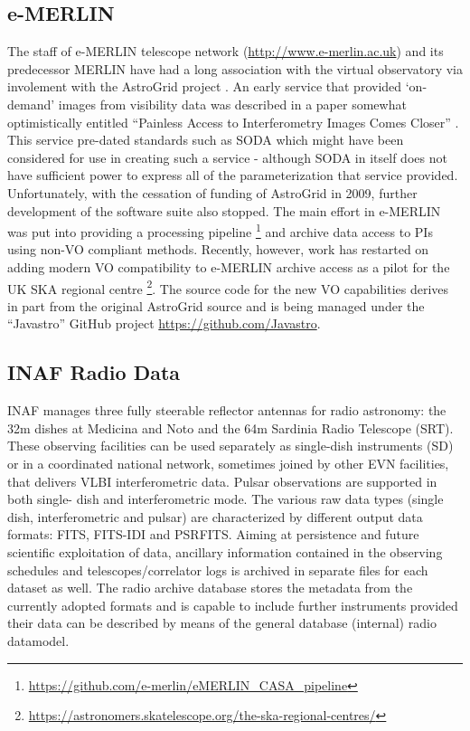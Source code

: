 \documentclass[11pt,a4paper]{ivoatex/ivoa}
\begin{document}
\subsection{e-MERLIN}
\label{sec:emerlin}
The staff of e-MERLIN telescope network (\url{http://www.e-merlin.ac.uk}) and its predecessor MERLIN have had a long association with the virtual
observatory via involement with the AstroGrid project \citep{2002ASPC..281....3M}. An early service that
 provided `on-demand' images from visibility data was described in a paper somewhat optimistically entitled
``Painless Access to Interferometry Images Comes Closer'' \citep{2006ASPC..351..267R}. This service pre-dated standards
such as SODA which might have been considered for use in creating such a service - although SODA in itself does not
have sufficient power to express all of the parameterization that service provided. Unfortunately, with the cessation
of funding of AstroGrid in 2009, further development of the software suite also stopped. The main effort in e-MERLIN was 
put into providing a processing pipeline \footnote{\url{https://github.com/e-merlin/eMERLIN_CASA_pipeline}} and archive data access to
PIs using non-VO compliant methods. Recently, however, work has restarted on adding modern VO compatibility to e-MERLIN
archive access as a pilot for the UK SKA regional centre \footnote{\url{https://astronomers.skatelescope.org/the-ska-regional-centres/}}.
The source code for the new VO capabilities derives in part from the original AstroGrid source and is being managed under the
``Javastro'' GitHub project \url{https://github.com/Javastro}.

\subsection{INAF Radio Data}
\label{sec:INAF}
INAF manages three fully steerable reflector antennas for radio astronomy: the 32m dishes at Medicina 
and Noto and the 64m Sardinia Radio Telescope (SRT). These observing facilities can be used separately 
as single-dish instruments (SD) or in a coordinated national network, sometimes joined by other EVN 
facilities, that delivers VLBI interferometric data. Pulsar observations are supported in both single-
dish and interferometric mode. The various raw data types (single dish, interferometric and pulsar) are 
characterized by different output data formats: FITS, FITS-IDI and PSRFITS. Aiming at persistence and 
future scientific exploitation of data, ancillary information contained in the observing schedules and 
telescopes/correlator logs is archived in separate files for each dataset as well. The radio archive 
database stores the metadata from the currently adopted formats and is capable to include further 
instruments provided their data can be described by means of the general database (internal) radio 
datamodel.
\end{document}
